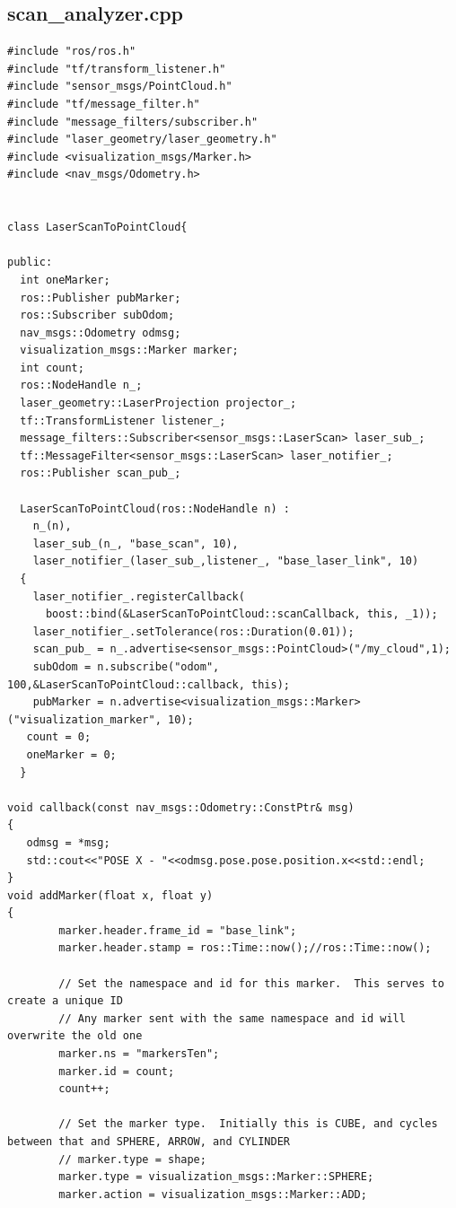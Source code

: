 \documentclass[14pt, a4paper]{extarticle}
\begin{document}
	\subsection{scan\_analyzer.cpp}
	\begin{lstlisting}
#include "ros/ros.h"
#include "tf/transform_listener.h"
#include "sensor_msgs/PointCloud.h"
#include "tf/message_filter.h"
#include "message_filters/subscriber.h"
#include "laser_geometry/laser_geometry.h"
#include <visualization_msgs/Marker.h>
#include <nav_msgs/Odometry.h>


class LaserScanToPointCloud{

public:
  int oneMarker;
  ros::Publisher pubMarker;
  ros::Subscriber subOdom;
  nav_msgs::Odometry odmsg;
  visualization_msgs::Marker marker;
  int count;
  ros::NodeHandle n_;
  laser_geometry::LaserProjection projector_;
  tf::TransformListener listener_;
  message_filters::Subscriber<sensor_msgs::LaserScan> laser_sub_;
  tf::MessageFilter<sensor_msgs::LaserScan> laser_notifier_;
  ros::Publisher scan_pub_;

  LaserScanToPointCloud(ros::NodeHandle n) : 
    n_(n),
    laser_sub_(n_, "base_scan", 10),
    laser_notifier_(laser_sub_,listener_, "base_laser_link", 10)
  {
    laser_notifier_.registerCallback(
      boost::bind(&LaserScanToPointCloud::scanCallback, this, _1));
    laser_notifier_.setTolerance(ros::Duration(0.01));
    scan_pub_ = n_.advertise<sensor_msgs::PointCloud>("/my_cloud",1);
    subOdom = n.subscribe("odom", 100,&LaserScanToPointCloud::callback, this);
    pubMarker = n.advertise<visualization_msgs::Marker>("visualization_marker", 10);
   count = 0;
   oneMarker = 0;
  }

void callback(const nav_msgs::Odometry::ConstPtr& msg)
{
   odmsg = *msg;
   std::cout<<"POSE X - "<<odmsg.pose.pose.position.x<<std::endl;
}
void addMarker(float x, float y)
{
        marker.header.frame_id = "base_link";
        marker.header.stamp = ros::Time::now();//ros::Time::now();
        
        // Set the namespace and id for this marker.  This serves to create a unique ID
        // Any marker sent with the same namespace and id will overwrite the old one
        marker.ns = "markersTen";
        marker.id = count;
        count++;
        
        // Set the marker type.  Initially this is CUBE, and cycles between that and SPHERE, ARROW, and CYLINDER
        // marker.type = shape;
        marker.type = visualization_msgs::Marker::SPHERE;
        marker.action = visualization_msgs::Marker::ADD;
        

\end{lstlisting}
\end{document}
